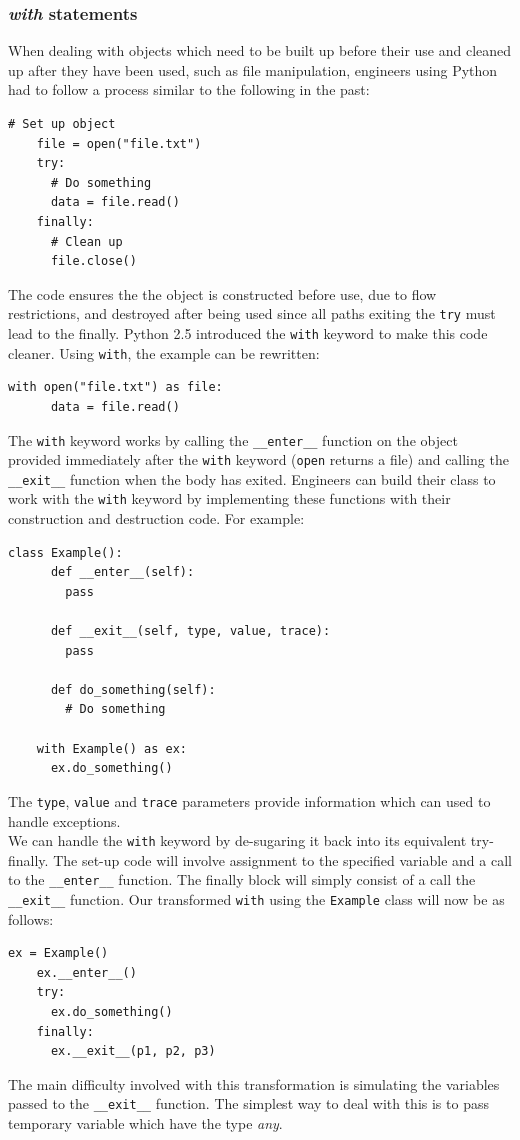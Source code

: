\documentclass[12pt, titlepage]{article}
\begin{document}
\subsubsection{\textit{with} statements}
When dealing with objects which need to be built up before their use and cleaned up after they have been used, such as file manipulation, engineers using Python had to follow a process similar to the following in the past:
\begin{lstlisting}[mathescape]
    # Set up object
    file = open("file.txt")
    try:
      # Do something
      data = file.read()
    finally:
      # Clean up
      file.close()
\end{lstlisting}
The code ensures the the object is constructed before use, due to flow restrictions, and destroyed after being used since all paths exiting the \texttt{try} must lead to the finally. Python 2.5 introduced the \texttt{with} keyword to make this code cleaner. Using \texttt{with}, the example can be rewritten:
\begin{lstlisting}[mathescape]
    with open("file.txt") as file:
      data = file.read()
\end{lstlisting}
The \texttt{with} keyword works by calling the \texttt{\_\_enter\_\_} function on the object provided immediately after the \texttt{with} keyword (\texttt{open} returns a file) and calling the \texttt{\_\_exit\_\_} function when the body has exited. Engineers can build their class to work with the \texttt{with} keyword by implementing these functions with their construction and destruction code. For example:
\begin{lstlisting}[mathescape]
    class Example():
      def __enter__(self):
        pass
			
      def __exit__(self, type, value, trace):
        pass
			
      def do_something(self):
        # Do something
			
    with Example() as ex:
      ex.do_something()
\end{lstlisting}
The \texttt{type}, \texttt{value} and \texttt{trace} parameters provide information which can used to handle exceptions. \\
\indent We can handle the \texttt{with} keyword by de-sugaring it back into its equivalent try-finally. The set-up code will involve assignment to the specified variable and a call to the \texttt{\_\_enter\_\_} function. The finally block will simply consist of a call the \texttt{\_\_exit\_\_} function. Our transformed \texttt{with} using the \texttt{Example} class will now be as follows:
\begin{lstlisting}[mathescape]
    ex = Example()
    ex.__enter__()
    try:
      ex.do_something()
    finally:
      ex.__exit__(p1, p2, p3)
\end{lstlisting}
The main difficulty involved with this transformation is simulating the variables passed to the \texttt{\_\_exit\_\_} function. The simplest way to deal with this is to pass temporary variable which have the type \textit{any}.
\end{document}
